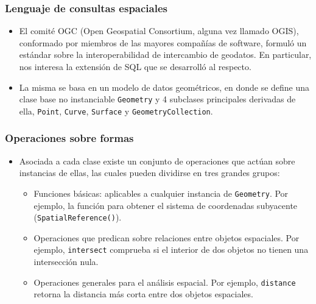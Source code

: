 \begin{frame}
\frametitle{Lenguaje de consultas espaciales}
\begin{itemize}
	\item	El comité OGC (Open Geospatial Consortium, alguna vez llamado OGIS),
		conformado por miembros de las mayores compañías de software, formuló
		un estándar sobre la interoperabilidad de intercambio de geodatos. En
		particular, nos interesa la extensión de SQL que se desarrolló al
		respecto. \pause

	\item	La misma se basa en un modelo de datos geométricos, en donde se
		define una clase base no instanciable \texttt{Geometry} y 4 subclases
		principales derivadas de ella, \texttt{Point}, \texttt{Curve},
		\texttt{Surface} y \texttt{GeometryCollection}.
\end{itemize}
\end{frame}

\begin{frame}
\frametitle{Operaciones sobre formas}
\begin{itemize}
	\item	Asociada a cada clase existe un conjunto de operaciones que actúan
		sobre instancias de ellas, las cuales pueden dividirse en tres grandes
		grupos: \pause

		\begin{itemize}
			\item Funciones básicas: aplicables a cualquier instancia de
			\texttt{Geometry}. Por ejemplo, la función para obtener el sistema de
			coordenadas subyacente (\texttt{SpatialReference()}). \pause

			\item Operaciones que predican sobre relaciones entre objetos
			espaciales. Por ejemplo, \texttt{intersect} comprueba si el interior de
			dos objetos no tienen una intersección nula. \pause

			\item Operaciones generales para el análisis espacial. Por ejemplo,
			\texttt{distance} retorna la distancia más corta entre dos objetos
			espaciales.
		\end{itemize}
\end{itemize}
\end{frame}

